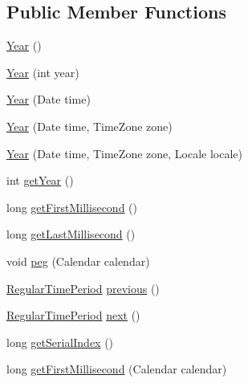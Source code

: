 \subsection*{Public Member Functions}
\begin{DoxyCompactItemize}
\item 
\mbox{\hyperlink{classorg_1_1jfree_1_1data_1_1time_1_1_year_aadd8bd67be12d625410714bf71b38f37}{Year}} ()
\item 
\mbox{\hyperlink{classorg_1_1jfree_1_1data_1_1time_1_1_year_ac0bf78131cf89bca067e3b5120e1cd50}{Year}} (int year)
\item 
\mbox{\hyperlink{classorg_1_1jfree_1_1data_1_1time_1_1_year_a8be658305c0cf8fac00562e23c2ba0a8}{Year}} (Date time)
\item 
\mbox{\hyperlink{classorg_1_1jfree_1_1data_1_1time_1_1_year_aa2e6f6acded9ea74ce136c04cb6d55cc}{Year}} (Date time, Time\+Zone zone)
\item 
\mbox{\hyperlink{classorg_1_1jfree_1_1data_1_1time_1_1_year_a5b0866b58a1bf8cffbfc02bab667888d}{Year}} (Date time, Time\+Zone zone, Locale locale)
\item 
int \mbox{\hyperlink{classorg_1_1jfree_1_1data_1_1time_1_1_year_ab6da2d250464461b6d9c83743ee07539}{get\+Year}} ()
\item 
long \mbox{\hyperlink{classorg_1_1jfree_1_1data_1_1time_1_1_year_ad4c7220e5cd2c321ff4108c7a73ff68b}{get\+First\+Millisecond}} ()
\item 
long \mbox{\hyperlink{classorg_1_1jfree_1_1data_1_1time_1_1_year_a57299a0e16c221eebc2f69e9daefc6ff}{get\+Last\+Millisecond}} ()
\item 
void \mbox{\hyperlink{classorg_1_1jfree_1_1data_1_1time_1_1_year_a98c518e97ade2b6267e1b421b0f91162}{peg}} (Calendar calendar)
\item 
\mbox{\hyperlink{classorg_1_1jfree_1_1data_1_1time_1_1_regular_time_period}{Regular\+Time\+Period}} \mbox{\hyperlink{classorg_1_1jfree_1_1data_1_1time_1_1_year_a0a068d4f45b412bde0a3d50181a5662a}{previous}} ()
\item 
\mbox{\hyperlink{classorg_1_1jfree_1_1data_1_1time_1_1_regular_time_period}{Regular\+Time\+Period}} \mbox{\hyperlink{classorg_1_1jfree_1_1data_1_1time_1_1_year_a6eb70611dd73047ccce20c9c0d1c21fb}{next}} ()
\item 
long \mbox{\hyperlink{classorg_1_1jfree_1_1data_1_1time_1_1_year_affe76a52fc33bf8bc60f04fa8726bc73}{get\+Serial\+Index}} ()
\item 
long \mbox{\hyperlink{classorg_1_1jfree_1_1data_1_1time_1_1_year_aee8afd7f92299328416efdf15465ae8a}{get\+First\+Millisecond}} (Calendar calendar)

\end{DoxyCompactItemize}
